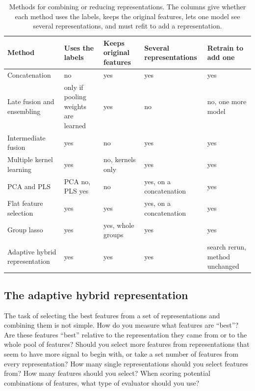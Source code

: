 \begin{table}[htbp]
\centering
\small
\setlength{\tabcolsep}{3pt}
\begin{adjustbox}{max width=\textwidth,max totalheight=0.78\textheight}
\begin{tabular}{P{4.2cm}P{2.3cm}P{2.1cm}P{2.3cm}P{2.6cm}}
\toprule
Method & Uses the labels & Keeps original features & Several representations & Retrain to add one \\
\midrule
Concatenation \citep{Stahlschmidt2022} & no & yes & yes & yes \\
Late fusion and ensembling \citep{Steyaert2023, Valsecchi2020} & only if pooling weights are learned & yes & no & no, one more model \\
Intermediate fusion \citep{Beaude2025} & yes & no & yes & yes \\
Multiple kernel learning \citep{Gonen2011, Cichonska2018} & yes & no, kernels only & yes & yes \\
PCA and PLS \citep{Jolliffe2016, Wold2001} & PCA no, PLS yes & no & yes, on a concatenation & yes \\
Flat feature selection \citep{Guyon2003} & yes & yes & yes, on a concatenation & yes \\
Group lasso \citep{Yuan2006} & yes & yes, whole groups & yes & yes \\
Adaptive hybrid representation & yes & yes & yes & search rerun, method unchanged \\
\bottomrule
\end{tabular}
\end{adjustbox}
\caption[Methods for combining or reducing representations.]{Methods for combining or reducing representations. The columns give whether each method uses the labels, keeps the original features, lets one model see several representations, and must refit to add a representation.}
\label{tab:hybrid_alternatives}
\end{table}

\subsection{The adaptive hybrid representation}

The task of selecting the best features from a set of representations and combining them is not simple. How do you measure what features are ``best''? Are these features ``best'' relative to the representation they came from or to the whole pool of features? Should you select more features from representations that seem to have more signal to begin with, or take a set number of features from every representation? How many single representations should you select features from? How many features should you select? When scoring potential combinations of features, what type of evaluator should you use?

